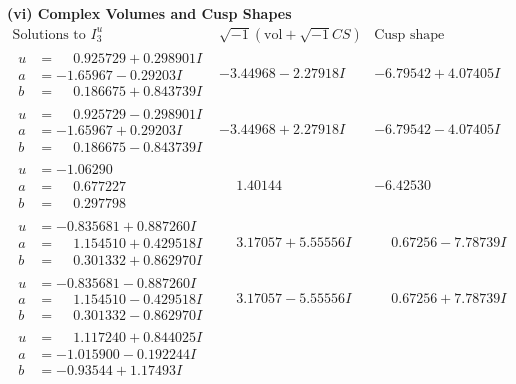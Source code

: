 \documentclass[1p]{elsarticle_modified}
\theoremstyle{definition}
\newcommand{\I}{\sqrt{-1}}
\begin{document}
\newpage\flushleft \textbf{(vi) Complex Volumes and Cusp Shapes}
$$\begin{array}{c|c|c}  
\text{Solutions to }I^u_{3}& \I (\text{vol} + \sqrt{-1}CS) & \text{Cusp shape}\\
 \hline 
\begin{aligned}
u &= \phantom{-}0.925729 + 0.298901 I \\
a &= -1.65967 - 0.29203 I \\
b &= \phantom{-}0.186675 + 0.843739 I\end{aligned}
 & -3.44968 - 2.27918 I & -6.79542 + 4.07405 I \\ \hline\begin{aligned}
u &= \phantom{-}0.925729 - 0.298901 I \\
a &= -1.65967 + 0.29203 I \\
b &= \phantom{-}0.186675 - 0.843739 I\end{aligned}
 & -3.44968 + 2.27918 I & -6.79542 - 4.07405 I \\ \hline\begin{aligned}
u &= -1.06290\phantom{ +0.000000I} \\
a &= \phantom{-}0.677227\phantom{ +0.000000I} \\
b &= \phantom{-}0.297798\phantom{ +0.000000I}\end{aligned}
 & \phantom{-}1.40144\phantom{ +0.000000I} & -6.42530\phantom{ +0.000000I} \\ \hline\begin{aligned}
u &= -0.835681 + 0.887260 I \\
a &= \phantom{-}1.154510 + 0.429518 I \\
b &= \phantom{-}0.301332 + 0.862970 I\end{aligned}
 & \phantom{-}3.17057 + 5.55556 I & \phantom{-}0.67256 - 7.78739 I \\ \hline\begin{aligned}
u &= -0.835681 - 0.887260 I \\
a &= \phantom{-}1.154510 - 0.429518 I \\
b &= \phantom{-}0.301332 - 0.862970 I\end{aligned}
 & \phantom{-}3.17057 - 5.55556 I & \phantom{-}0.67256 + 7.78739 I \\ \hline\begin{aligned}
u &= \phantom{-}1.117240 + 0.844025 I \\
a &= -1.015900 - 0.192244 I \\
b &= -0.93544 + 1.17493 I\end{aligned}

\end{array}$$
\end{document}

